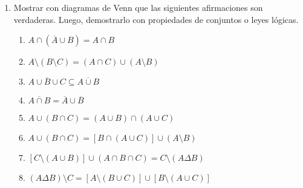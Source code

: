 \documentclass[a4paper]{article}
\newcommand{\answer}{\item[**]}
\newcommand{\exercise}{\item}
\newcommand{\intersec}{\cap}
\newcommand{\union}{\cup}
\newcommand{\symdiff}{\Delta}
\newcommand{\compl}[1]{\overline{#1}}
\newcommand{\img}[2]{ \begin{minipage}[t]{\linewidth} \raisebox{-\height}{\texttt{[image: \#2]}} \end{minipage} } %
\begin{document}
\begin{enumerate}
\begin{multicols}{2}
\begin{enumerate} [label=(\alph*)]
		\item \img{4cm}{img/conj7.png}
		\answer $(A \intersec B) \setminus C$

		\item \img{4cm}{img/conj4.png}
		\answer $(B \intersec C) \symdiff A$

		\item \img{4cm}{img/conj5.png}
		\answer $\compl{(B \union C) \setminus A}$

		\item \img{4cm}{img/conj6.png}
		\answer $\compl{(A \union B) \intersec C}$


		\item \img{4cm}{img/conj2.png}
		\answer $[ A \setminus (B \union C) ] \union [(B \intersec C) \setminus A ]$

		\item \img{4cm}{img/conj8.png}
		\answer $[A \setminus (B \union C)] \union (A \intersec B \intersec C)$

	\end{enumerate}
	\end{multicols}

	\exercise Mostrar con diagramas de Venn que las siguientes afirmaciones son verdaderas. Luego, demostrarlo con propiedades de conjuntos o leyes lógicas.
	\begin{multicols}{2}
	\begin{enumerate} [label=(\alph*)]
		\item $A \intersec (\compl{A} \union B) = A \intersec B$
		\item $A \setminus (B \setminus C) = (A \intersec C) \union (A \setminus B)$
		\item $\compl{A \union B \union C} \subseteq \compl{A \union B}$
		\item $\compl{A \intersec B} = \compl{A} \union \compl{B}$
		\item $A \union (B \intersec C) = (A\union B) \intersec (A \union C)$ 
		\item $A \union (B \intersec C) = [B \intersec (A \union C)] \union (A \setminus B)$
		\item $[C \setminus (A \union B)] \union (A \intersec B \intersec C) = C \setminus (A \symdiff B)$
		\item $(A \symdiff B) \setminus C = [A \setminus (B \union C)] \union [B \setminus (A \union C)]$


	\end{enumerate}
	\end{multicols}


\end{enumerate}
\end{document}
